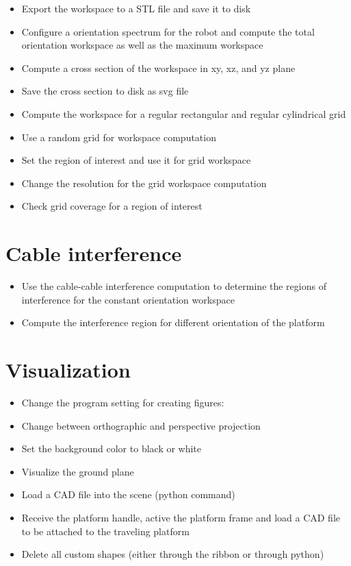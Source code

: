 \begin{itemize}
\item  {Export the workspace to a STL file and save it to
  disk}
\item  {Configure a orientation spectrum for the robot and
  compute the total orientation workspace as well as the maximum
  workspace}
\item  {Compute a cross section of the workspace in xy, xz, and
  yz
  plane}
\item  {Save the cross section to disk as svg
  file}
\item  {Compute the workspace for a regular rectangular and
  regular cylindrical
  grid}
\item  {Use a random grid for workspace
  computation}
\item  {Set the region of interest and use it for grid
  workspace}
\item  {Change the resolution for the grid workspace
  computation}
\item  {Check grid coverage for a region of
  interest}
\end{itemize}

\section{Cable interference}

\begin{itemize}
\item  {Use the cable-cable interference computation to
  determine the regions of interference for the constant orientation
  workspace}
\item  {Compute the interference region for different
  orientation of the
  platform}
\end{itemize}

\section{Visualization}

\begin{itemize}
\item  {Change the program setting for creating
  figures:}
\item  {Change between orthographic and perspective
  projection}
\item  {Set the background color to black or
  white}
\item  {Visualize the ground
  plane}
\item  {Load a CAD file into the scene (python
  command)}
\item  {Receive the platform handle, active the platform frame
  and load a CAD file to be attached to the traveling
  platform}
\item  {Delete all custom shapes (either through the ribbon or
  through
  python)}
\end{itemize}

